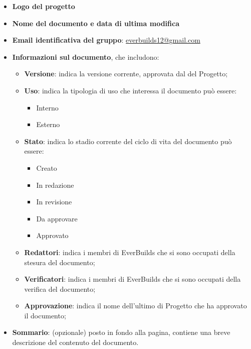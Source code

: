                    \begin{itemize}
                        \item\textbf{Logo del progetto}
                        \item\textbf{Nome del documento e data di ultima modifica}
                        \item\textbf{Email identificativa del gruppo}: \href{mailto:everbuilds12@gmail.com}{everbuilds12@gmail.com}
                        \item\textbf{Informazioni sul documento}, che includono: \\
                            \begin{itemize}
                                \item\textbf{Versione}: indica la versione corrente, approvata dal  del Progetto;
                                \item\textbf{Uso}: indica la tipologia di uso che interessa il documento può essere:
                                    \begin{itemize}
                                        \item Interno
                                        \item Esterno
                                    \end{itemize}
                                \item\textbf{Stato}: indica lo stadio corrente del ciclo di vita del documento può essere: 
                                    \begin{itemize}
                                        \item Creato
                                        \item In redazione
                                        \item In revisione
                                        \item Da approvare
                                        \item Approvato
                                    \end{itemize}
                                \item\textbf{Redattori}: indica i membri di EverBuilds che si sono occupati della stesura del documento;
                                \item\textbf{Verificatori}: indica i membri di EverBuilds che si sono occupati della verifica del documento;
                                \item\textbf{Approvazione}: indica il nome dell’ultimo  di Progetto che ha approvato il documento;
                            \end{itemize}
                        \item\textbf{Sommario}: (opzionale) posto in fondo alla pagina, contiene una breve descrizione del contenuto del documento.
                    \end{itemize}
